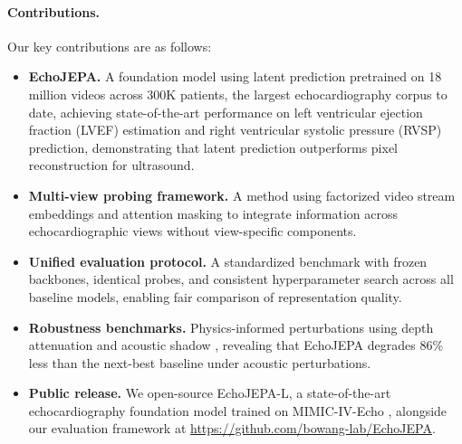 \documentclass{article}
\theoremstyle{plain}
\theoremstyle{definition}
\theoremstyle{remark}
\begin{document}
\paragraph{Contributions.} Our key contributions are as follows:

\begin{itemize}[leftmargin=10pt, itemsep=2pt, topsep=0pt]
\item \textbf{EchoJEPA.} A foundation model using latent prediction pretrained on 18 million videos across 300K patients, the largest echocardiography corpus to date, achieving state-of-the-art performance on left ventricular ejection fraction (LVEF) estimation and right ventricular systolic pressure (RVSP) prediction, demonstrating that latent prediction outperforms pixel reconstruction for ultrasound.
\item \textbf{Multi-view probing framework.} A method using factorized video stream embeddings and attention masking to integrate information across echocardiographic views without view-specific components.
\item \textbf{Unified evaluation protocol.} A standardized benchmark with frozen backbones, identical probes, and consistent hyperparameter search across all baseline models, enabling fair comparison of representation quality.
\item \textbf{Robustness benchmarks.} Physics-informed perturbations using depth attenuation and acoustic shadow \citep{pmlr-v172-singla22a}, revealing that EchoJEPA degrades 86\% less than the next-best baseline under acoustic perturbations.
\item \textbf{Public release.} We open-source EchoJEPA-L, a state-of-the-art echocardiography foundation model trained on MIMIC-IV-Echo \citep{PhysioNet-mimic-iv-echo-0.1}, alongside our evaluation framework at \url{https://github.com/bowang-lab/EchoJEPA}.
\end{itemize}


    
    
\end{document}
